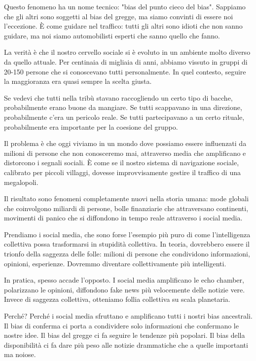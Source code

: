 Questo fenomeno ha un nome tecnico: "bias del punto cieco del bias". Sappiamo che gli altri sono soggetti al bias del gregge, ma siamo convinti di essere noi l'eccezione. È come guidare nel traffico: tutti gli altri sono idioti che non sanno guidare, ma noi siamo automobilisti esperti che sanno quello che fanno.

\medskip

La verità è che il nostro cervello sociale si è evoluto in un ambiente molto diverso da quello attuale. Per centinaia di migliaia di anni, abbiamo vissuto in gruppi di 20-150 persone che si conoscevano tutti personalmente. In quel contesto, seguire la maggioranza era quasi sempre la scelta giusta.

Se vedevi che tutti nella tribù stavano raccogliendo un certo tipo di bacche, probabilmente erano buone da mangiare. Se tutti scappavano in una direzione, probabilmente c'era un pericolo reale. Se tutti partecipavano a un certo rituale, probabilmente era importante per la coesione del gruppo.

Il problema è che oggi viviamo in un mondo dove possiamo essere influenzati da milioni di persone che non conosceremo mai, attraverso media che amplificano e distorcono i segnali sociali. È come se il nostro sistema di navigazione sociale, calibrato per piccoli villaggi, dovesse improvvisamente gestire il traffico di una megalopoli.

Il risultato sono fenomeni completamente nuovi nella storia umana: mode globali che coinvolgono miliardi di persone, bolle finanziarie che attraversano continenti, movimenti di panico che si diffondono in tempo reale attraverso i social media.

\bigskip

Prendiamo i social media, che sono forse l'esempio più puro di come l'intelligenza collettiva possa trasformarsi in stupidità collettiva. In teoria, dovrebbero essere il trionfo della saggezza delle folle: milioni di persone che condividono informazioni, opinioni, esperienze. Dovremmo diventare collettivamente più intelligenti.

In pratica, spesso accade l'opposto. I social media amplificano le echo chamber, polarizzano le opinioni, diffondono fake news più velocemente delle notizie vere. Invece di saggezza collettiva, otteniamo follia collettiva su scala planetaria.

Perché? Perché i social media sfruttano e amplificano tutti i nostri bias ancestrali. Il bias di conferma ci porta a condividere solo informazioni che confermano le nostre idee. Il bias del gregge ci fa seguire le tendenze più popolari. Il bias della disponibilità ci fa dare più peso alle notizie drammatiche che a quelle importanti ma noiose.

